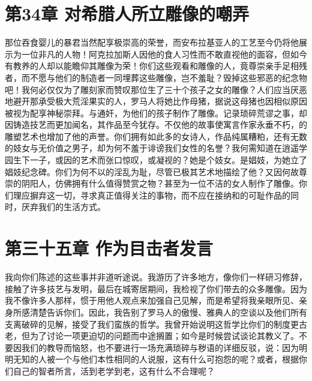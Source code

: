 \section{第34章 对希腊人所立雕像的嘲弄}

那位吞食婴儿的暴君当然配享极崇高的荣誉，而安布拉基亚人的工艺至今仍将他展示为一位非凡的人物！阿克拉加斯人因他的食人习性而不敢直视他的面容，但如今有教养的人却以能瞻仰其雕像为荣！你们这些观看和雕像的人，竟尊崇亲手足相残者，而不愿与他们的制造者一同埋葬这些雕像，岂不羞耻？毁掉这些邪恶的纪念物吧！我何必仅仅为了雕刻家而赞叹那位生了三十个孩子之女的雕像？人们应当厌恶地避开那承受极大荒淫果实的人，罗马人将她比作母猪，据说这母猪也因相似原因被视为配享神秘崇拜。与通奸，为他们的孩子制作了雕像。记录琐碎荒谬之事，却因铸造技艺而更加闻名，其作品至今犹存。不仅他的故事使寓言作家永垂不朽，的雕塑艺术也增加了他的声誉。你们拥有如此多的女诗人，作品纯属糟粕，还有无数的妓女与无价值之男子，却为何不羞于诽谤我们女性的名誉？我何需知道在逍遥学园生下一子，或因的艺术而张口惊叹，或凝视的？她是个妓女。是娼妓，为她立了娼妓纪念碑。你们为何不以的淫乱为耻，尽管已极其艺术地描绘了他？又因何故尊崇的阴阳人，仿佛拥有什么值得赞赏之物？甚至为一位不洁的女人制作了雕像。你们理应摒弃这一切，寻求真正值得关注的事物，而不应在接纳和的可耻作品的同时，厌弃我们的生活方式。\par


\section{第三十五章 作为目击者发言}

我向你们陈述的这些事并非道听途说。我游历了许多地方，像你们一样研习修辞，接触了许多技艺与发明，最后在城寄居期间，我检视了你们带去的众多雕像。因为我不像许多人那样，惯于用他人观点来加强自己见解，而是希望将我亲眼所见、亲身所感清楚告诉你们。因此，我告别了罗马人的傲慢、雅典人的空谈以及他们所有支离破碎的见解，接受了我们蛮族的哲学。我曾开始说明这哲学比你们的制度更古老，但为了讨论一项更迫切的问题而中途搁置；如今是时候尝试谈论其教义了。不要因我们的教导而恼怒，也不要进行一场充满琐碎与秽语的详细反驳，说：因为明明无知的人被一个与他们本性相同的人说服，这有什么可抱怨的呢？或者，根据你们自己的智者所言，活到老学到老，这有什么不合理呢？\par

